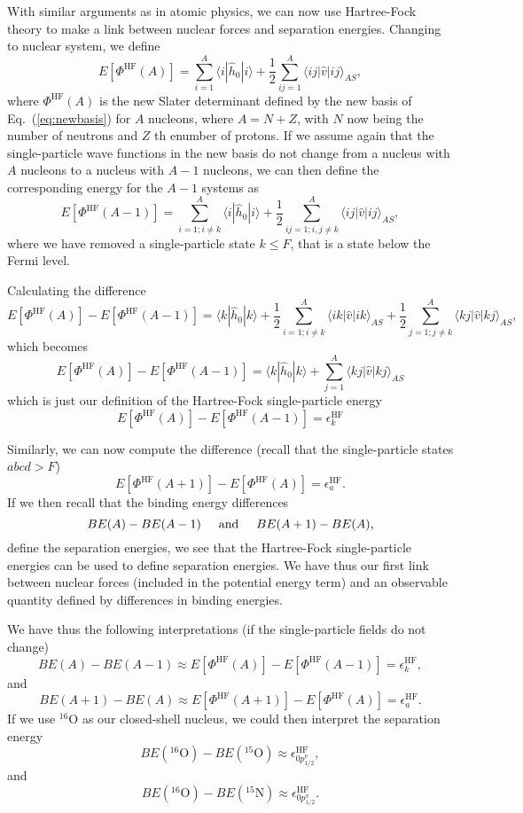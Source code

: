 \documentclass[%
oneside,                 %
final,                   %
10pt]{article}
\begin{document}
With similar arguments as in atomic physics, we can now use Hartree-Fock theory to make a link
between nuclear forces and separation energies. Changing to nuclear system, we define
\[
  E[\Phi^{\mathrm{HF}}(A)] 
  = \sum_{i=1}^A \langle i | \hat{h}_0 | i \rangle +
  \frac{1}{2}\sum_{ij=1}^A\langle ij|\hat{v}|ij\rangle_{AS},
\]
where $\Phi^{\mathrm{HF}}(A)$ is the new Slater determinant defined by the new basis of Eq.~(\ref{eq:newbasis})
for $A$ nucleons, where $A=N+Z$, with $N$ now being the number of neutrons and $Z$ th enumber of protons.  If we assume again that the single-particle wave functions in the new basis do not change from a nucleus with $A$ nucleons to a nucleus with $A-1$  nucleons, we can then define the corresponding energy for the $A-1$ systems as 
\[
  E[\Phi^{\mathrm{HF}}(A-1)] 
  = \sum_{i=1; i\ne k}^A \langle i | \hat{h}_0 | i \rangle +
  \frac{1}{2}\sum_{ij=1;i,j\ne k}^A\langle ij|\hat{v}|ij\rangle_{AS},
\]
where we have removed a single-particle state $k\le F$, that is a state below the Fermi level.  




Calculating the difference 
\[
  E[\Phi^{\mathrm{HF}}(A)]-   E[\Phi^{\mathrm{HF}}(A-1)] 
  = \langle k | \hat{h}_0 | k \rangle +
  \frac{1}{2}\sum_{i=1;i\ne k}^A\langle ik|\hat{v}|ik\rangle_{AS} + \frac{1}{2}\sum_{j=1;j\ne k}^A\langle kj|\hat{v}|kj\rangle_{AS},
\]
which becomes 
\[
  E[\Phi^{\mathrm{HF}}(A)]-   E[\Phi^{\mathrm{HF}}(A-1)] 
  = \langle k | \hat{h}_0 | k \rangle +\sum_{j=1}^A\langle kj|\hat{v}|kj\rangle_{AS}
\]
which is just our definition of the Hartree-Fock single-particle energy
\[
  E[\Phi^{\mathrm{HF}}(A)]-   E[\Phi^{\mathrm{HF}}(A-1)] 
  = \epsilon_k^{\mathrm{HF}} 
\]




Similarly, we can now compute the difference (recall that the single-particle states $abcd > F$)
\[
  E[\Phi^{\mathrm{HF}}(A+1)]-   E[\Phi^{\mathrm{HF}}(A)]= \epsilon_a^{\mathrm{HF}}. 
\]
If we then recall that the binding energy differences 
\[
BE(A)-BE(A-1) \hspace{0.5cm} \mathrm{and} \hspace{0.5cm} BE(A+1)-BE(A), 
\]
define the separation energies, we see that the Hartree-Fock single-particle energies can be used to
define separation energies. We have thus our first link between nuclear forces (included in the potential energy term) and an observable quantity defined by differences in binding energies. 




We have thus the following interpretations (if the single-particle fields do not change)
\[
BE(A)-BE(A-1)\approx  E[\Phi^{\mathrm{HF}}(A)]-   E[\Phi^{\mathrm{HF}}(A-1)] 
  = \epsilon_k^{\mathrm{HF}}, 
\]
and
\[
BE(A+1)-BE(A)\approx  E[\Phi^{\mathrm{HF}}(A+1)]-   E[\Phi^{\mathrm{HF}}(A)] =  \epsilon_a^{\mathrm{HF}}. 
\]
If  we use ${}^{16}\mbox{O}$ as our closed-shell nucleus, we could then interpret the separation energy
\[
BE(^{16}\mathrm{O})-BE(^{15}\mathrm{O})\approx \epsilon_{0p^{\nu}_{1/2}}^{\mathrm{HF}}, 
\]
and
\[
BE(^{16}\mathrm{O})-BE(^{15}\mathrm{N})\approx \epsilon_{0p^{\pi}_{1/2}}^{\mathrm{HF}}.
\]
\end{document}

